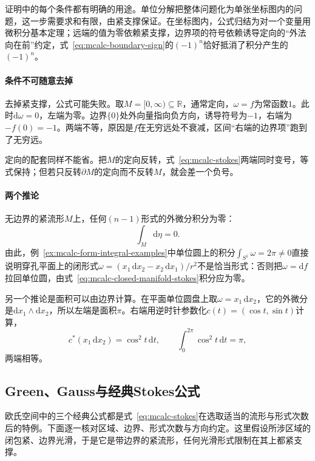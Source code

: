 证明中的每个条件都有明确的用途。单位分解把整体问题化为单张坐标图内的问题，这一步需要求和有限，由紧支撑保证。在坐标图内，公式归结为对一个变量用微积分基本定理；远端的值为零依赖紧支撑，边界项的符号依赖诱导定向的“外法向在前”约定，式~\eqref{eq:mcalc-boundary-sign}的$(-1)^n$恰好抵消了积分产生的$(-1)^n$。

\paragraph{条件不可随意去掉}
去掉紧支撑，公式可能失败。取$M=[0,\infty)\subseteq\mathbb R$，通常定向，$\omega=f$为常函数$1$。此时$\mathrm d\omega=0$，左端为零。边界$\{0\}$处外向量指向负方向，诱导符号为$-1$，右端为$-f(0)=-1$。两端不等，原因是$f$在无穷远处不衰减，区间“右端的边界项”跑到了无穷远。

定向的配套同样不能省。把$M$的定向反转，式~\eqref{eq:mcalc-stokes}两端同时变号，等式保持；但若只反转$\partial M$的定向而不反转$M$，就会差一个负号。

\paragraph{两个推论}
无边界的紧流形$M$上，任何$(n-1)$形式的外微分积分为零：
\begin{equation}
\int_M\mathrm d\eta=0 .
\label{eq:mcalc-closed-manifold-stokes}
\end{equation}
由此，例~\ref{ex:mcalc-form-integral-examples}中单位圆上的积分$\int_{S^1}\omega=2\pi\neq0$直接说明穿孔平面上的闭形式$\omega=(x_1\,\mathrm dx_2-x_2\,\mathrm dx_1)/r^2$不是恰当形式：否则把$\omega=\mathrm df$拉回单位圆，由式~\eqref{eq:mcalc-closed-manifold-stokes}积分应为零。

另一个推论是面积可以由边界计算。在平面单位圆盘上取$\omega=x_1\,\mathrm dx_2$，它的外微分是$\mathrm dx_1\wedge\mathrm dx_2$，所以左端是面积$\pi$。右端用逆时针参数化$c(t)=(\cos t,\sin t)$计算，
\[
c^*(x_1\,\mathrm dx_2)=\cos^2t\,\mathrm dt ,\qquad
\int_0^{2\pi}\cos^2t\,\mathrm dt=\pi ,
\]
两端相等。

\subsection{Green、Gauss与经典Stokes公式}
\label{sec:mcalc-classical-formulas}

欧氏空间中的三个经典公式都是式~\eqref{eq:mcalc-stokes}在选取适当的流形与形式次数后的特例。下面逐一核对区域、边界、形式次数与方向约定。这里假设所涉区域的闭包紧、边界光滑，于是它是带边界的紧流形，任何光滑形式限制在其上都紧支撑。

